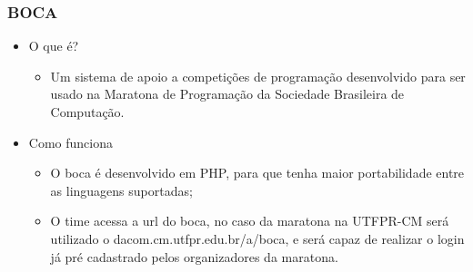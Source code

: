 \begin{frame}
  \frametitle{BOCA}
  \begin{itemize}
    \item O que é?
    \begin{itemize}
      \item Um sistema de apoio a competições de programação desenvolvido para ser usado na Maratona de Programação da Sociedade Brasileira de Computação.
    \end{itemize}
    \item Como funciona
    \begin{itemize}
      \item O boca é desenvolvido em PHP, para que tenha maior portabilidade entre as linguagens suportadas;
      \item O time acessa a url do boca, no caso da maratona na UTFPR-CM será utilizado o dacom.cm.utfpr.edu.br/a/boca, e será capaz de realizar o login já pré cadastrado pelos organizadores da maratona.
    \end{itemize}
  \end{itemize}
\end{frame}